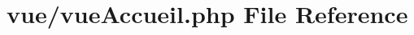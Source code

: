 \hypertarget{vue_accueil_8php}{}\section{vue/vue\+Accueil.php File Reference}
\label{vue_accueil_8php}
